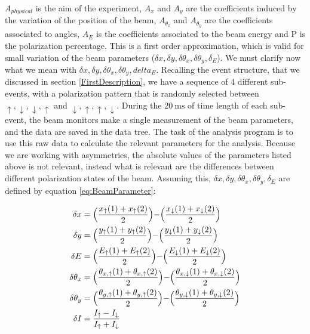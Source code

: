 $A_{physical}$ is the aim of the experiment, $A_{x}$ and $A_{y}$ are the coefficients induced by the variation of the position of the beam, $A_{\theta_{x}}$ and $A_{\theta_{y}}$ are the coefficients associated to angles, $A_{E}$ is the coefficients associated to the beam energy and P is the polarization percentage. 
This is a first order approximation, which is valid for small variation of the beam parameters ($\delta x, \delta y, \delta \theta_{x}, \delta \theta_{y}, \delta_{E}$).
We must clarify now what we mean with $\delta x, \delta y, \delta \theta_{x}, \delta \theta_{y}, delta_{E}$. Recalling the event structure, that we discussed in section \ref{FirstDescription}, we have a sequence of 4 different sub-events, with a polarization pattern that is randomly selected between $\uparrow,\downarrow,\downarrow, \uparrow$ and $\downarrow,\uparrow,\uparrow,\downarrow$. During the $\SI{20}{\milli \second}$ of time length of each sub-event, the beam monitors make a single measurement of the beam parameters, and the data are saved in the data tree. The task of the analysis program is to use this raw data to calculate the relevant parameters for the analysis. Because we are working with asymmetries, the absolute values of the parameters listed above is not relevant, instead what is relevant are the differences between different polarization states of the beam. Assuming this, $\delta x, \delta y, \delta \theta_{x}, \delta \theta_{y}, \delta_{E}$ are defined by equation \ref{eq:BeamParameter}:

\begin{equation} \label{eq:BeamParameter}
\begin{split}
\delta {x} & = \Bigl(\dfrac{x_{\uparrow}(1) + x_{\uparrow}(2)}{2}\Bigl)  - \Bigl(\dfrac{x_{\downarrow}(1) + x_{\downarrow}(2)}{2}\Bigl)\\
\delta {y} & = \Bigl(\dfrac{y_{\uparrow}(1) + y_{\uparrow}(2)}{2}\Bigl)  - \Bigl(\dfrac{y_{\downarrow}(1) + y_{\downarrow}(2)}{2}\Bigl)\\
\delta {E} & = \Bigl(\dfrac{E_{\uparrow}(1) + E_{\uparrow}(2)}{2}\Bigl)  - \Bigl(\dfrac{E_{\downarrow}(1) + E_{\downarrow}(2)}{2}\Bigl)\\
\delta {\theta_{x}} & = \Bigl( \dfrac{\theta_{x,\uparrow}(1) + \theta_{x,\uparrow}(2)}{2} \Bigl) - \Bigl(\dfrac{\theta_{x,\downarrow}(1) + \theta_{x,\downarrow}(2)}{2} \Bigl)\\
\delta {\theta_{y}} & = \Bigl( \dfrac{\theta_{y,\uparrow}(1) + \theta_{y,\uparrow}(2)}{2} \Bigl) - \Bigl(\dfrac{\theta_{y,\downarrow}(1) + \theta_{y,\downarrow}(2)}{2} \Bigl)\\ 
\delta I &= \dfrac{I_{\uparrow} - I_{\downarrow}}{I_{\uparrow} + I_{\downarrow}} \\
\end{split}
\end{equation}

